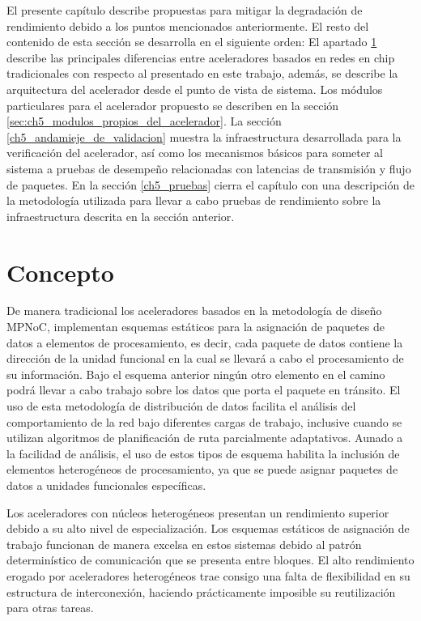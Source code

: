El presente capítulo describe propuestas para mitigar la degradación de rendimiento debido a los puntos mencionados anteriormente. El resto del contenido de esta sección se desarrolla en el siguiente orden: El apartado \ref{sec:ch5_concepto} describe las principales diferencias entre aceleradores basados en redes en chip tradicionales con respecto al presentado en este trabajo, además, se describe la arquitectura del acelerador desde el punto de vista de sistema. Los módulos particulares para el acelerador propuesto se describen en la sección \ref{sec:ch5_modulos_propios_del_acelerador}. La sección \ref{ch5_andamieje_de_validacion} muestra la infraestructura desarrollada para la verificación del acelerador, así como los mecanismos básicos para someter al sistema a pruebas de desempeño relacionadas con latencias de transmisión y flujo de paquetes. En la sección \ref{ch5_pruebas} cierra el capítulo con una descripción de la metodología utilizada para llevar a cabo pruebas de rendimiento sobre la infraestructura descrita en la sección anterior.
	

\section{Concepto}
	\label{sec:ch5_concepto}

De manera tradicional los aceleradores basados en la metodología de diseño MPNoC, implementan esquemas estáticos para la asignación de paquetes de datos a elementos de procesamiento, es decir, cada paquete de datos contiene la dirección de la unidad funcional en la cual se llevará a cabo el procesamiento de su información. Bajo el esquema anterior ningún otro elemento en el camino podrá llevar a cabo trabajo sobre los datos que porta el paquete en tránsito. El uso de esta metodología de distribución de datos facilita el análisis del comportamiento de la red bajo diferentes cargas de trabajo, inclusive cuando se utilizan algoritmos de planificación de ruta parcialmente adaptativos. Aunado a la facilidad de análisis, el uso de estos tipos de esquema habilita la inclusión de elementos heterogéneos de procesamiento, ya que se puede asignar paquetes de datos a unidades funcionales específicas.

Los aceleradores con núcleos heterogéneos presentan un rendimiento superior debido a su alto nivel de especialización. Los esquemas estáticos de asignación de trabajo funcionan de manera excelsa en estos sistemas debido al patrón determinístico de comunicación que se presenta entre bloques. El alto rendimiento erogado por aceleradores heterogéneos trae consigo una falta de flexibilidad en su estructura de interconexión, haciendo prácticamente imposible su reutilización para otras tareas.

